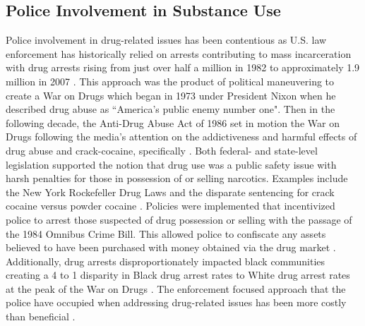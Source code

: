 
\subsection{Police Involvement in Substance Use}

Police involvement in drug-related issues has been contentious as U.S. law enforcement has historically relied on arrests contributing to mass incarceration with drug arrests rising from just over half a million in 1982 to approximately 1.9 million in 2007 \parencite{bureau_of_justice_statistics_drugs_2015}. This approach was the product of political maneuvering to create a War on Drugs which began in 1973 under President Nixon when he described drug abuse as ``America's public enemy number one"\parencite{cooper_war_2015, lynch_theorizing_2012}. Then in the following decade, the Anti-Drug Abuse Act of 1986 set in motion the War on Drugs following the media's attention on the addictiveness and harmful effects of drug abuse and crack-cocaine, specifically \parencite{reinarman_2_1998}. Both federal- and state-level legislation supported the notion that drug use was a public safety issue with harsh penalties for those in possession of or selling narcotics. Examples include the New York Rockefeller Drug Laws \parencite{drucker_population_2002} and the disparate sentencing for crack cocaine versus powder cocaine \parencite{shein_racial_1993}. Policies were implemented that incentivized police to arrest those suspected of drug possession or selling with the passage of the 1984 Omnibus Crime Bill. This allowed police to confiscate any assets believed to have been purchased with money obtained via the drug market \parencite{beckett_politics_2003}. Additionally, drug arrests disproportionately impacted black communities creating a 4 to 1 disparity in Black drug arrest rates to White drug arrest rates at the peak of the War on Drugs \parencite{western_punishment_2006}. The enforcement focused approach that the police have occupied when addressing drug-related issues has been more costly than beneficial \parencite{baum_smoke_1996}.

